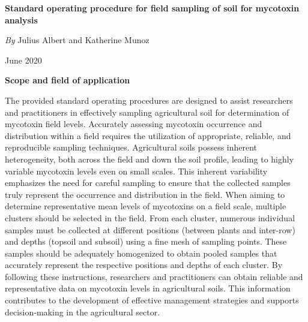 \begin{refsection}
\begin{center} 
\HRule 
\vspace{0.2cm}
\Huge \textbf{Standard operating procedure for field sampling of soil for mycotoxin analysis}
\vspace{0.2cm}
\HRule 
\end{center}

\vspace{2cm}
\begin{center} 
\LARGE \textit{By} Julius Albert and Katherine  Munoz


\LARGE June 2020
\end{center}

\clearpage





\noindent\large{\textbf{Scope and field of application}}


The provided standard operating procedures are designed to assist researchers and practitioners in effectively sampling agricultural soil for determination of mycotoxin field levels.  Accurately assessing mycotoxin occurrence and distribution within a field requires the utilization of appropriate, reliable, and reproducible sampling techniques. Agricultural soils possess inherent heterogeneity, both across the field and down the soil profile, leading to highly variable mycotoxin levels even on small scales. This inherent variability emphasizes the need for careful sampling to ensure that the collected samples truly represent the occurrence and distribution in the field. When aiming to determine representative mean levels of mycotoxins on a field scale, multiple clusters should be selected in the field. From each cluster, numerous individual samples must be collected at different positions (between plants and inter-row) and depths (topsoil and subsoil) using a fine mesh of sampling points. These samples should be adequately homogenized to obtain pooled samples that accurately represent the respective positions and depths of each cluster. By following these instructions, researchers and practitioners can obtain reliable and representative data on mycotoxin levels in agricultural soils. This information contributes to the development of effective management strategies and supports decision-making in the agricultural sector.


\end{refsection}
